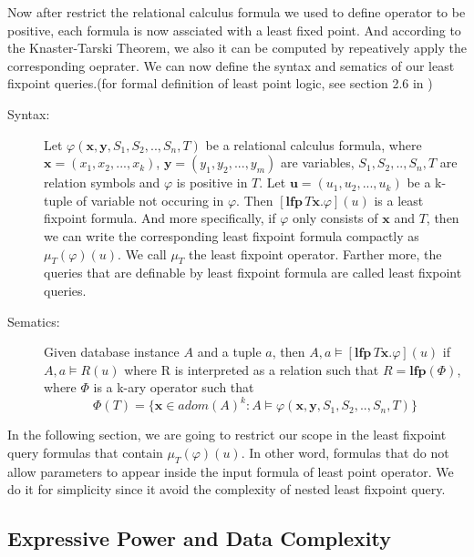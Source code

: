 Now after restrict the relational calculus formula we used to define operator to be positive, each formula is now assciated with a least fixed point. And according to the Knaster-Tarski Theorem, we also it can be computed by repeatively apply the corresponding oeprater. We can now define the syntax and sematics of our least fixpoint queries.(for formal definition of least point logic, see section 2.6 in \cite{kolaitis1})\\

\begin{description}

\item[Syntax:]
Let $\varphi(\textbf{x},\textbf{y}, S_1,S_2,..,S_n, T)$ be a relational calculus formula, where $\textbf{x}=(x_1, x_2,...,x_k)$, $\textbf{y}=(y_1,y_2,...,y_m)$ are variables, $S_1,S_2,..,S_n, T$ are relation symbols and $\varphi$ is positive in $T$. Let $\textbf{u}=(u_1, u_2,...,u_k)$ be a k-tuple of variable not occuring in $\varphi$. Then $[\textbf{lfp}\,T\textbf{x}.\varphi](u)$ is a least fixpoint formula. And more specifically, if $\varphi$ only consists of $\textbf{x}$ and $T$, then we can write the corresponding least fixpoint formula compactly as $\mu_T(\varphi)(u)$. We call $\mu_T$ the least fixpoint operator. Farther more, the queries that are definable by least fixpoint formula are called least fixpoint queries.\\

\item[Sematics:]
Given database instance $A$ and a tuple $a$, then $A, a \models [\textbf{lfp}\,T\textbf{x}.\varphi](u)$ if $A, a \models R(u)$ where R is interpreted as a relation such that $R=\textbf{lfp}(\Phi)$, where $\Phi$ is a k-ary operator such that
$$ \Phi(T) = \{\textbf{x}\in adom(A)^k: A\models \varphi(\textbf{x},\textbf{y},S_1,S_2,..,S_n,T)\}$$ 

\end{description}

In the following section, we are going to restrict our scope in the least fixpoint query formulas that contain $\mu_T(\varphi)(u)$. In other word, formulas that do not allow parameters to appear inside the input formula of least point operator. We do it for simplicity since it avoid the complexity of nested least fixpoint query.\\ 

\subsection{Expressive Power and Data Complexity}

